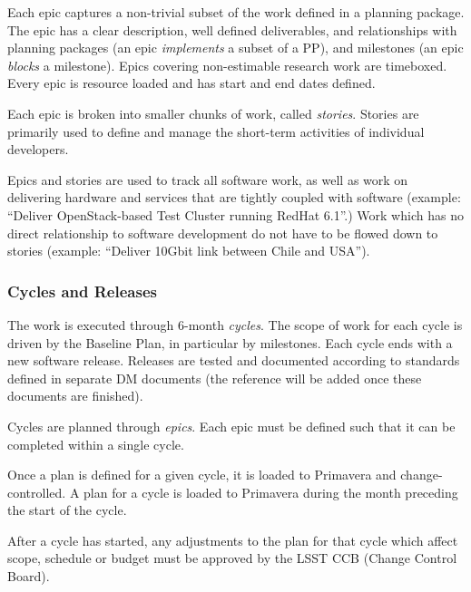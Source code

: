 \documentclass[DM,toc,obsolete]{lsstdoc}
\newcommand{\sphinxstyleemphasis}{\emph}
\newcommand{\sphinxstyleabbreviation}{\textsc}
\begin{document}
Each epic captures a non-trivial subset of the work defined in a planning package.  The epic has a clear
description, well defined deliverables, and relationships with planning packages (an epic \sphinxstyleemphasis{implements} a subset of a PP),
and milestones (an epic \sphinxstyleemphasis{blocks} a milestone). Epics covering non-estimable research work are timeboxed.
Every epic is resource loaded and has start and end dates defined.

Each epic is broken into smaller chunks of work, called \sphinxstyleemphasis{stories}. Stories are primarily used
to define and manage the short-term activities of individual developers.

Epics and stories are used to track all software work, as well as work on delivering hardware and services
that are tightly coupled with software (example: ``Deliver OpenStack-based Test Cluster running RedHat 6.1''.)
Work which has no direct relationship to software development do not have to be flowed down to stories
(example: ``Deliver 10Gbit link between Chile and USA'').


\subsubsection{Cycles and Releases}
\label{\detokenize{index:cycles-and-releases}}\label{\detokenize{index:id9}}
The work is executed through 6-month \sphinxstyleemphasis{cycles}. The scope of work for each cycle is driven by the
Baseline Plan, in particular by milestones. Each cycle ends with a new software release. Releases are
tested and documented according to standards defined in separate DM documents (the reference will be
added once these documents are finished).

Cycles are planned through \sphinxstyleemphasis{epics}. Each epic must be defined such that it can be completed
within a single cycle.

Once a plan is defined for a given cycle, it is loaded to Primavera and change-controlled. A plan for
a cycle is loaded to Primavera during the month preceding the start of the cycle.

After a cycle has started, any adjustments to the plan for that cycle which affect scope, schedule or budget
must be approved by the LSST \sphinxstyleabbreviation{CCB} (Change Control Board).
\end{document}
